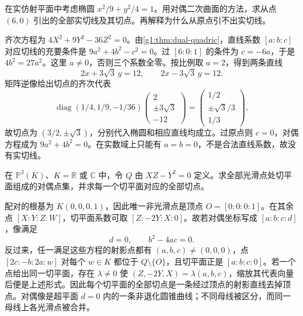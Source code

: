 \begin{exercise}\label{g1:ex:ellipse-tangents}
	在实仿射平面中考虑椭圆 \(x^2/9+y^2/4=1\)。用对偶二次曲面的方法，求从点 \((6,0)\) 引出的全部实切线及其切点。再解释为什么从原点引不出实切线。
\end{exercise}
\begin{solution}
	齐次方程为 \(4X^2+9Y^2-36Z^2=0\)。由\cref{g1:thm:dual-quadric}，直线系数 \([a:b:c]\) 对应切线的充要条件是 \(9a^2+4b^2-c^2=0\)。过 \([6:0:1]\) 的条件为 \(c=-6a\)，于是 \(4b^2=27a^2\)。这里 \(a\ne0\)，否则三个系数全零。按比例取 \(a=2\)，得到两条直线
	\[
		2x+3\sqrt3\,y=12,\qquad 2x-3\sqrt3\,y=12.
	\]
	矩阵逆像给出切点的齐次代表
	\[
		\operatorname{diag}(1/4,1/9,-1/36)
		\begin{pmatrix}2\\ \pm3\sqrt3\\ -12\end{pmatrix}
		=\begin{pmatrix}1/2\\ \pm\sqrt3/3\\ 1/3\end{pmatrix},
	\]
	故切点为 \((3/2,\pm\sqrt3)\)，分别代入椭圆和相应直线均成立。过原点则 \(c=0\)，对偶方程成为 \(9a^2+4b^2=0\)。在实数域上只能有 \(a=b=0\)，不是合法直线系数，故没有实切线。
\end{solution}

\begin{exercise}\label{g1:ex:cone-dual-fibers}
	在 \(\mathbb P^3(K)\)、\(K=\mathbb R\) 或 \(\mathbb C\) 中，令 \(Q\) 由 \(XZ-Y^2=0\) 定义。求全部光滑点处切平面组成的对偶点集，并求每一个切平面对应的全部切点。
\end{exercise}
\begin{solution}
	配对的根基为 \(K(0,0,0,1)\)，因此唯一非光滑点是顶点 \(O=[0:0:0:1]\)。在其余点 \([X:Y:Z:W]\)，切平面系数可取 \([Z:-2Y:X:0]\)。故若对偶坐标写成 \([a:b:c:d]\)，像满足
	\[
		d=0,\qquad b^2-4ac=0.
	\]
	反过来，任一满足这些方程的射影点都有 \((a,b,c)\ne(0,0,0)\)，点 \([2c:-b:2a:w]\) 对每个 \(w\in K\) 都位于 \(Q\setminus\{O\}\)，且切平面正是 \([a:b:c:0]\)。若一个点给出同一切平面，存在 \(\lambda\ne0\) 使 \((Z,-2Y,X)=\lambda(a,b,c)\)，缩放其代表向量后便是上述形式。因此每个切平面的全部切点是一条经过顶点的射影直线去掉顶点。对偶像是超平面 \(d=0\) 内的一条非退化圆锥曲线；不同母线被区分，而同一母线上各光滑点被合并。
\end{solution}

